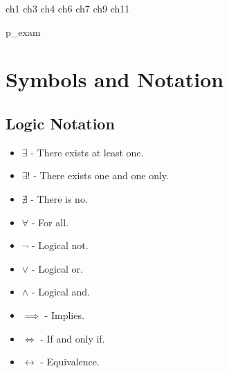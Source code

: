 \documentclass[fullpage]{article}
\newif\ifanswers
\begin{document}
{ch1}
\newpage
{ch3}
\newpage
{ch4}
\newpage
{ch6}
\newpage
{ch7}
\newpage
{ch9}
\newpage
{ch11}
\newpage

\appendix
\ifanswers
\newpage
{answers}
\fi
\newpage
{p_exam}
\newpage
\section{Symbols and Notation}
\subsection*{Logic Notation}
\begin{itemize}
    \item $\exists$ - There exists at least one.
    \item $\exists!$ - There exists one and one only.
    \item $\nexists$ - There is no.
    \item $\forall$ - For all.
    \item $\neg$ - Logical not.
    \item $\lor$ - Logical or.
    \item $\land$ - Logical and.
    \item $\implies$ - Implies.
    \item $\iff$ - If and only if.
    \item $\leftrightarrow$ - Equivalence.
\end{itemize}
\end{document}

